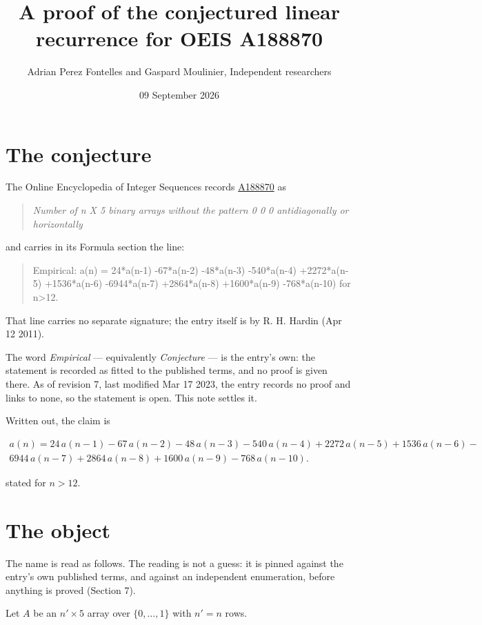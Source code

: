 \documentclass[11pt]{article}
\title{A proof of the conjectured linear recurrence for OEIS A188870}
\author{Adrian Perez Fontelles and Gaspard Moulinier, Independent researchers}
\date{09 September 2026}
\theoremstyle{definition}
\begin{document}
\maketitle
\section{The conjecture}

The Online Encyclopedia of Integer Sequences records \href{https://oeis.org/A188870}{A188870} as

\begin{quote}\itshape Number of n X 5 binary arrays without the pattern 0 0 0 antidiagonally or horizontally\end{quote}

and carries in its Formula section the line:

\begin{quote}\ttfamily Empirical: a(n) = 24*a(n-1) -67*a(n-2) -48*a(n-3) -540*a(n-4) +2272*a(n-5) +1536*a(n-6) -6944*a(n-7) +2864*a(n-8) +1600*a(n-9) -768*a(n-10) for n>12.\end{quote}

That line carries no separate signature; the entry itself is by R. H. Hardin (Apr 12 2011).

The word {\itshape Empirical} --- equivalently {\itshape Conjecture} --- is the entry's own: the statement is recorded as fitted to the published terms, and no proof is given there. As of revision 7, last modified Mar 17 2023, the entry records no proof and links to none, so the statement is open. This note settles it.

Written out, the claim is

\begin{multline*} a(n) = 24\,a(n-1) - 67\,a(n-2) - 48\,a(n-3) - 540\,a(n-4) + 2272\,a(n-5) + 1536\,a(n-6) - \\ 6944\,a(n-7) + 2864\,a(n-8) + 1600\,a(n-9) - 768\,a(n-10). \end{multline*}

stated for $n > 12$.

\section{The object}

The name is read as follows. The reading is not a guess: it is pinned against the entry's own published terms, and against an independent enumeration, before anything is proved (Section 7).

Let $A$ be an $n' \times 5$ array over $\{0,\dots,1\}$ with $n' = n$ rows.
\end{document}
